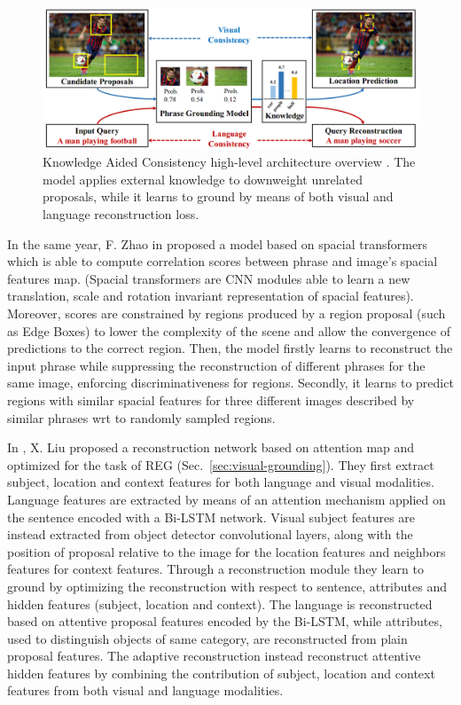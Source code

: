 \begin{figure}
  \centering
  \includegraphics[width=.8\textwidth]{figures/kac-example.png}
  \caption[Knowledge Aided Consistency high-level architecture
  overview]{ Knowledge Aided Consistency high-level architecture
  overview \cite{chen2018knowledge}. The model applies external
  knowledge to downweight unrelated proposals, while it learns to
  ground by means of both visual and language reconstruction loss. }
  \label{fig:kac-example}
\end{figure}

In the same year, F. Zhao \etal{} in \cite{zhao2018weakly} proposed a
model based on spacial transformers \cite{jaderberg2015spatial} which
is able to compute correlation scores between phrase and image's
spacial features map. (Spacial transformers are CNN modules able to
learn a new translation, scale and rotation invariant representation
of spacial features). Moreover, scores are constrained by regions
produced by a region proposal (such as Edge Boxes) to lower the
complexity of the scene and allow the convergence of predictions to
the correct region. Then, the model firstly learns to reconstruct the
input phrase while suppressing the reconstruction of different phrases
for the same image, enforcing discriminativeness for regions.
Secondly, it learns to predict regions with similar spacial features
for three different images described by similar phrases wrt to
randomly sampled regions.

In \cite{liu2019adaptive}, X. Liu \etal{} proposed a reconstruction
network based on attention map and optimized for the task of REG
(Sec.~\ref{sec:visual-grounding}). They first extract subject,
location and context features for both language and visual modalities.
Language features are extracted by means of an attention mechanism
applied on the sentence encoded with a Bi-LSTM network. Visual subject
features are instead extracted from object detector convolutional
layers, along with the position of proposal relative to the image for
the location features and neighbors features for context features.
Through a reconstruction module they learn to ground by optimizing
the reconstruction with respect to sentence, attributes and hidden
features (subject, location and context). The language is
reconstructed based on attentive proposal features encoded by the
Bi-LSTM, while attributes, used to distinguish objects of same
category, are reconstructed from plain proposal features. The adaptive
reconstruction instead reconstruct attentive hidden features by
combining the contribution of subject, location and context features
from both visual and language modalities.

